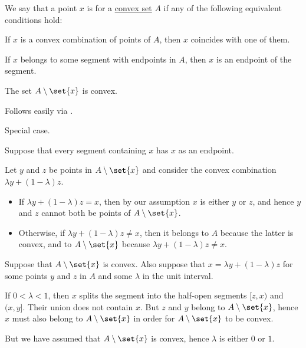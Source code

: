 \begin{definition}\label{def:extremal_point}
  We say that a point \( x \) is  for a \hyperref[def:convex_hull]{convex set} \( A \) if any of the following equivalent conditions hold:

  \begin{thmenum}
     If \( x \) is a convex combination of points of \( A \), then \( x \) coincides with one of them.

     If \( x \) belongs to some segment with endpoints in \( A \), then \( x \) is an endpoint of the segment.

     The set \( A \setminus \set{ x } \) is convex.
  \end{thmenum}
\end{definition}
\begin{defproof}
   Follows easily via .

   Special case.

   Suppose that every segment containing \( x \) has \( x \) as an endpoint.

  Let \( y \) and \( z \) be points in \( A \setminus \set{ x } \) and consider the convex combination \( \lambda y + (1 - \lambda) z \).

  \begin{itemize}
    \item If \( \lambda y + (1 - \lambda) z = x \), then by our assumption \( x \) is either \( y \) or \( z \), and hence \( y \) and \( z \) cannot both be points of \( A \setminus \set{ x } \).

    \item Otherwise, if \( \lambda y + (1 - \lambda) z \neq x \), then it belongs to \( A \) because the latter is convex, and to \( A \setminus \set{ x } \) because \( \lambda y + (1 - \lambda) z \neq x \).
  \end{itemize}

   Suppose that \( A \setminus \set{ x } \) is convex. Also suppose that \( x = \lambda y + (1 - \lambda) z \) for some points \( y \) and \( z \) in \( A \) and some \( \lambda \) in the unit interval.

  If \( 0 < \lambda < 1 \), then \( x \) splits the segment into the half-open segments \( [z, x) \) and \( (x, y] \). Their union does not contain \( x \). But \( z \) and \( y \) belong to \( A \setminus \set{ x } \), hence \( x \) must also belong to \( A \setminus \set{ x } \) in order for \( A \setminus \set{ x } \) to be convex.

  But we have assumed that \( A \setminus \set{ x } \) is convex, hence \( \lambda \) is either \( 0 \) or \( 1 \).
\end{defproof}

